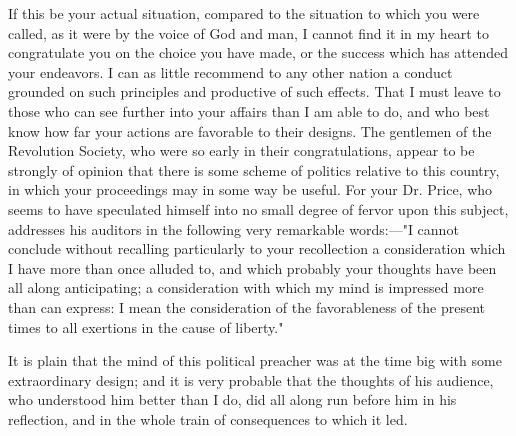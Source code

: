 If this be your actual situation, compared to the situation to which you were called, as it were by the voice of God and man, I cannot find it in my heart to congratulate you on the choice you have made, or the success which has attended your endeavors. I can as little recommend to any other nation a conduct grounded on such principles and productive of such effects. That I must leave to those who can see further into your affairs than I am able to do, and who best know how far your actions are favorable to their designs. The gentlemen of the Revolution Society, who were so early in their congratulations, appear to be strongly of opinion that there is some scheme of politics relative to this country, in which your proceedings may in some way be useful. For your Dr. Price, who seems to have speculated himself into no small degree of fervor upon this subject, addresses his auditors in the following very remarkable words:—"I cannot conclude without recalling particularly to your recollection a consideration which I have more than once alluded to, and which probably your thoughts have been all along anticipating; a consideration with which my mind is impressed more than can express: I mean the consideration of the favorableness of the present times to all exertions in the cause of liberty."

It is plain that the mind of this political preacher was at the time big with some extraordinary design; and it is very probable that the thoughts of his audience, who understood him better than I do, did all along run before him in his reflection, and in the whole train of consequences to which it led.

